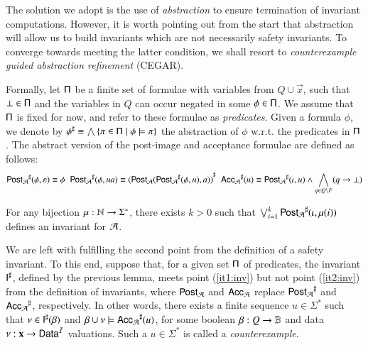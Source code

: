 \documentclass{llncs}
\begin{document}
The solution we adopt is the use of \emph{abstraction} to ensure
termination of invariant computations. However, it is worth pointing
out from the start that abstraction will allow us to build invariants
which are not necessarily safety invariants. To converge towards
meeting the latter condition, we shall resort to \emph{counterexample
  guided abstraction refinement} (CEGAR). 

Formally, let $\mathsf{\Pi}$ be a finite set of formulae with variables from
$Q \cup \vec{x}$, such that $\bot \in \mathsf{\Pi}$ and the variables in $Q$
can occur negated in some $\phi \in \mathsf{\Pi}$. We assume that $\mathsf{\Pi}$
is fixed for now, and refer to these formulae as \emph{predicates}.
Given a formula $\phi$, we denote by ${\phi}^\sharp \equiv \bigwedge
\left\{ \pi \in \mathsf{\Pi} \mid \phi \models \pi \right\}$ the abstraction of $\phi$
w.r.t. the predicates in $\mathsf{\Pi}$. The abstract version of the
post-image and acceptance formulae are defined as follows:
{\footnotesize\[
{\mathsf{Post}_{\mathcal{A}}}^\sharp(\phi,\varepsilon) \equiv \phi 
\hspace*{2mm}
{\mathsf{Post}_{\mathcal{A}}}^\sharp(\phi,ua) \equiv {(\mathsf{Post}_{\mathcal{A}}({\mathsf{Post}_{\mathcal{A}}}^\sharp(\phi,u),a))}^\sharp 
\hspace*{2mm}
{\mathsf{Acc}_{\mathcal{A}}}^\sharp(u) \equiv {\mathsf{Post}_{\mathcal{A}}}^\sharp(\iota,u) \wedge \bigwedge_{q \in Q \setminus F} (q \rightarrow \bot)
\]}
\begin{lemma}\label{lemma:abstract-invariant}
  For any bijection $\mu : {\bf \mathbb{N}} \rightarrow \Sigma^*$, there exists
  $k>0$ such that $\bigvee_{i=1}^k {\mathsf{Post}_{\mathcal{A}}}^\sharp(\iota,\mu(i))$ defines
  an invariant for $\mathcal{A}$. 
\end{lemma}

We are left with fulfilling the second point from the definition of a
safety invariant. To this end, suppose that, for a given set $\mathsf{\Pi}$
of predicates, the invariant ${\mathsf{I}}^\sharp$, defined by the previous
lemma, meets point (\ref{it1:inv}) but not point (\ref{it2:inv}) from
the definition of invariants, where $\mathsf{Post}_{\mathcal{A}}$ and $\mathsf{Acc}_{\mathcal{A}}$
replace ${\mathsf{Post}_{\mathcal{A}}}^\sharp$ and ${\mathsf{Acc}_{\mathcal{A}}}^\sharp$, respectively. In
other words, there exists a finite sequence $u \in \Sigma^*$ such that
$\nu \in {\mathsf{I}}^\sharp(\beta)$ and $\beta\cup\nu \models
{\mathsf{Acc}_{\mathcal{A}}}^\sharp(u)$, for some boolean $\beta : Q \rightarrow \mathbb{B}$
and data $\nu : \mathbf x \rightarrow \mathsf{Data}^{\mathcal{I}}$ valuations. Such
a $u\in\Sigma^*$ is called a \emph{counterexample}.
\end{document}
